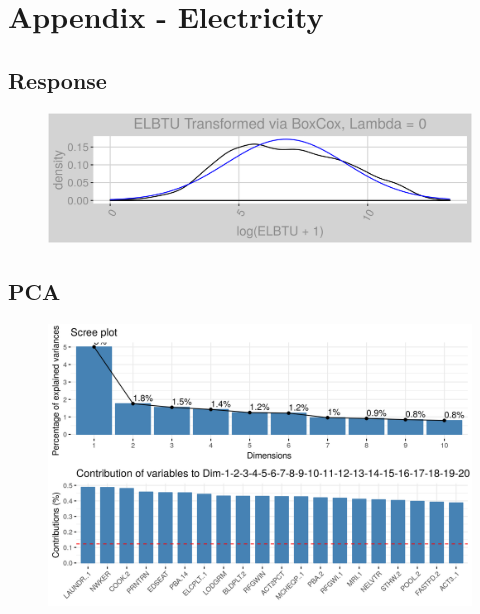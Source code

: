 \section*{Appendix - Electricity}
\label{sec:appendix_elec}
\appendix
\subsection{Response}
\label{appendix:electricity:response}
\begin{figure}[h]
\centering
\includegraphics[width=\textwidth, height=0.3\textheight]{Images/electricity_response.png}
\end{figure}
\subsection{PCA}
\label{appendix:electricity:pca}
\begin{figure}[h]
\centering
\includegraphics[width=\textwidth, height=0.3\textheight]{Images/electricity_pca_vars.png}
\end{figure}
\FloatBarrier
\newpage
